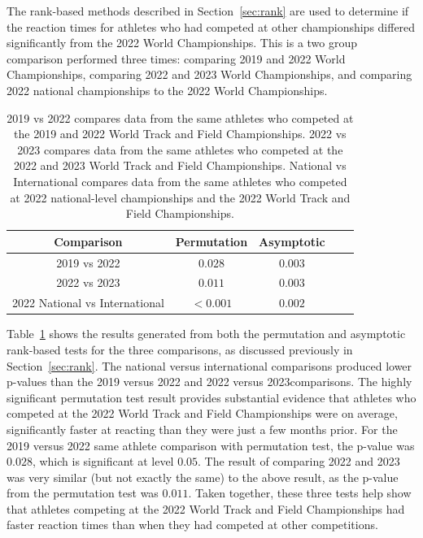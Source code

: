 \documentclass[12pt, letterpaper]{article}
\begin{document}
The rank-based methods described in Section~\ref{sec:rank} are used
to determine if the reaction times for athletes who had competed at other 
championships differed significantly from the 2022 World Championships. This is
a two group comparison performed three times: comparing 2019 and 2022 World
Championships, comparing 2022 and 2023 World Championships, and comparing 2022 
national championships to the 2022 World Championships.


\begin{table}
  \centering
  \caption{2019 vs 2022 compares data from the same athletes who competed at the
  2019 and 2022 World Track and Field Championships. 2022 vs 2023 compares data
  from the same athletes who competed at the 2022 and 2023 World Track and Field
  Championships. National vs International compares data from the same athletes
  who competed at 2022 national-level championships and the 2022 World Track and
  Field Championships.}
  \begin{tabular}{c c c c c} 
   \toprule
   Comparison & Permutation & Asymptotic \\ 
   \midrule
   2019 vs 2022 & $0.028$ & $0.003$ \\
   2022 vs 2023 & $0.011$ & $0.003$ \\
   2022 National vs International & $<0.001$ & $0.002$ \\
   \bottomrule
  \end{tabular}
  \label{tab:Clusrankresults}
\end{table}


Table~\ref{tab:Clusrankresults} shows the results generated from both the 
permutation and asymptotic rank-based tests for the three comparisons, 
as discussed previously in Section~\ref{sec:rank}. The national versus international
comparisons produced lower p-values than the 2019 versus 2022 and 2022 versus 2023comparisons.%
The highly significant permutation test result provides substantial evidence 
that athletes who competed at the
2022 World Track and Field Championships were on average, significantly faster
at reacting than they were just a few months prior. For the 2019 versus 2022
same athlete comparison with permutation test, the p-value was 
$0.028$, which is significant at level $0.05$.  The result of
comparing 2022 and 2023 was very similar (but not exactly the same) to the above
result, as the p-value from the permutation test was $0.011$.
Taken together, these three
tests help show that athletes competing at the 2022 World Track and Field
Championships had faster reaction times than when they had competed at other
competitions.
\end{document}
